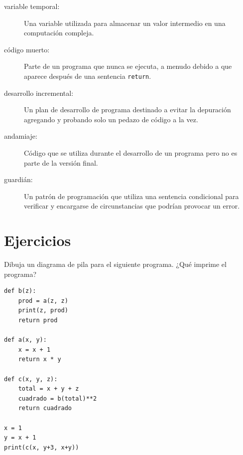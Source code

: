\documentclass[10pt]{book}
\begin{document}
\begin{description}

\item[variable temporal:]  Una variable utilizada para almacenar un valor intermedio en
una computación compleja.

\item[código muerto:]  Parte de un programa que nunca se ejecuta, a menudo debido a que
aparece después de una sentencia {\tt return}.

\item[desarrollo incremental:]  Un plan de desarrollo de programa destinado a
evitar la depuración agregando y probando solo
un pedazo de código a la vez.

\item[andamiaje:]  Código que se utiliza durante el desarrollo de un programa pero
no es parte de la versión final.

\item[guardián:]  Un patrón de programación que utiliza una sentencia
condicional para verificar y encargarse de circunstancias que
podrían provocar un error.

\end{description}


\section{Ejercicios}

\begin{exercise}

Dibuja un diagrama de pila para el siguiente programa.  ¿Qué imprime el programa?

\begin{verbatim}
def b(z):
    prod = a(z, z)
    print(z, prod)
    return prod

def a(x, y):
    x = x + 1
    return x * y

def c(x, y, z):
    total = x + y + z
    cuadrado = b(total)**2
    return cuadrado

x = 1
y = x + 1
print(c(x, y+3, x+y))
\end{verbatim}

\end{exercise}
\end{document}
